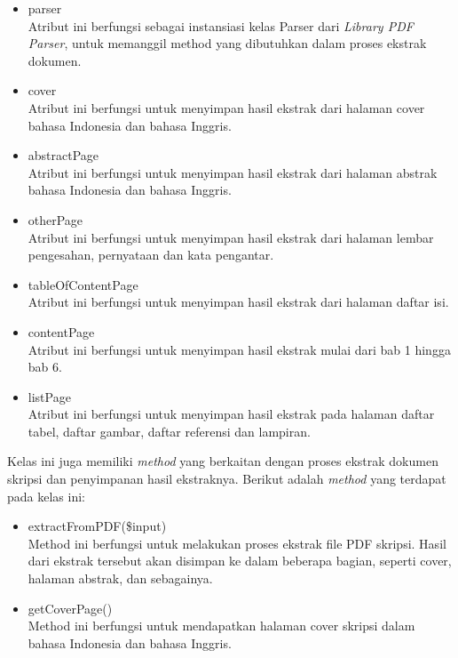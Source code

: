\begin{enumerate}
\begin{itemize}
			\item parser \\			
			Atribut ini berfungsi sebagai instansiasi kelas Parser dari \textit{Library PDF Parser}, untuk memanggil method yang dibutuhkan dalam proses ekstrak dokumen.
			
			\item cover \\
			Atribut ini berfungsi untuk menyimpan hasil ekstrak dari halaman cover bahasa Indonesia dan bahasa Inggris.
			
			\item abstractPage \\			
			Atribut ini berfungsi untuk menyimpan hasil ekstrak dari halaman abstrak bahasa Indonesia dan bahasa Inggris.
			
			\item otherPage \\
			Atribut ini berfungsi untuk menyimpan hasil ekstrak dari halaman lembar pengesahan, pernyataan dan kata pengantar.
			
			\item tableOfContentPage \\
			Atribut ini berfungsi untuk menyimpan hasil ekstrak dari halaman daftar isi.
			
			\item contentPage \\	
			Atribut ini berfungsi untuk menyimpan hasil ekstrak mulai dari bab 1 hingga bab 6.
			
			\item listPage \\
			Atribut ini berfungsi untuk menyimpan hasil ekstrak pada halaman daftar tabel, daftar gambar, daftar referensi dan lampiran.
			
		\end{itemize}
	
	Kelas ini juga memiliki \textit{method} yang berkaitan dengan proses ekstrak dokumen skripsi dan penyimpanan hasil ekstraknya. Berikut adalah \textit{method} yang terdapat pada kelas ini:
		
		\begin{itemize}
			\item extractFromPDF(\$input) \\
			Method ini berfungsi untuk melakukan proses ekstrak file PDF skripsi. Hasil dari ekstrak tersebut akan disimpan ke dalam beberapa bagian, seperti cover, halaman abstrak, dan sebagainya. 
			
			\item getCoverPage() \\
			Method ini berfungsi untuk mendapatkan halaman cover skripsi dalam bahasa Indonesia dan bahasa Inggris.
			

\end{itemize}
\end{enumerate}
